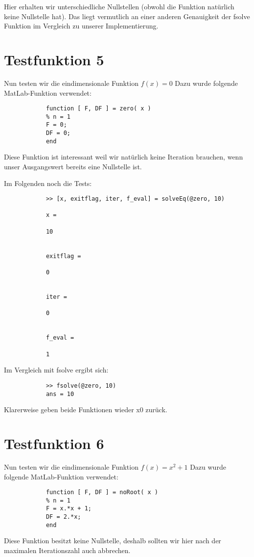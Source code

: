 \documentclass[11pt,titlepage]{article}
\begin{document}
		Hier erhalten wir unterschiedliche Nullstellen (obwohl die Funktion natürlich keine Nullstelle hat). Das liegt vermutlich an einer anderen Genauigkeit der fsolve Funktion im Vergleich zu unserer Implementierung.
		
	\section{Testfunktion 5}
		Nun testen wir die eindimensionale Funktion $ f(x) = 0$
		Dazu wurde folgende MatLab-Funktion verwendet:
		\begin{lstlisting}
			function [ F, DF ] = zero( x )
			% n = 1
			F = 0;
			DF = 0;
			end
		\end{lstlisting}
		Diese Funktion ist interessant weil wir natürlich keine Iteration brauchen, wenn unser Ausgangswert bereits eine Nullstelle ist.
	
		Im Folgenden noch die Tests:
		
		\begin{lstlisting}
			>> [x, exitflag, iter, f_eval] = solveEq(@zero, 10)
			
			x =
			
			10
			
			
			exitflag =
			
			0
			
			
			iter =
			
			0
			
			
			f_eval =
			
			1
		\end{lstlisting}
		
		Im Vergleich mit fsolve ergibt sich:
		
		\begin{lstlisting}
			>> fsolve(@zero, 10)
			ans = 10
		\end{lstlisting}
	
			Klarerweise geben beide Funktionen wieder x0 zurück.
	
	\section{Testfunktion 6}
		Nun testen wir die eindimensionale Funktion $ f(x) = x^2 + 1$
		Dazu wurde folgende MatLab-Funktion verwendet:
		\begin{lstlisting}
			function [ F, DF ] = noRoot( x )
			% n = 1
			F = x.*x + 1;
			DF = 2.*x;
			end
		\end{lstlisting}
		Diese Funktion besitzt keine Nullstelle, deshalb sollten wir hier nach der maximalen Iterationszahl auch abbrechen.
	
\end{document}
